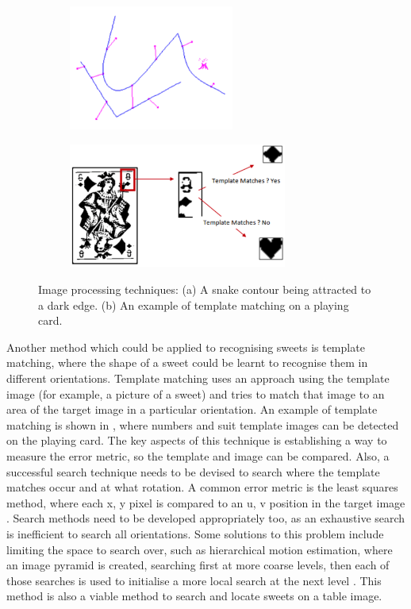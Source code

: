 \begin{figure}[H]
    \captionsetup[figure]{justification=centering}
    \begin{subfigure}[H]{0.475\textwidth}   
        \centering 
        \caption{}
        \includegraphics[width=\textwidth, height=4.1cm]{snake.png}
        \label{fig:snake}
    \end{subfigure}
    \begin{subfigure}[H]{0.475\textwidth}   
        \centering
        \caption{}
        \includegraphics[width=\textwidth, height=4.1cm]{template.png}
        \label{fig:template}
    \end{subfigure}
    \captionsetup{justification=centering}
    \caption{Image processing techniques: (a) A snake contour being attracted to a dark edge. (b) An example of template matching on a playing card.}
\end{figure}
Another method which could be applied to recognising sweets is template matching, where the shape of a sweet could be learnt to recognise them in different orientations. Template matching uses an approach using the template image (for example, a picture of a sweet) and tries to match that image to an area of the target image in a particular orientation. An example of template matching is shown in \textbf{}, where numbers and suit template images can be detected on the playing card. The key aspects of this technique is establishing a way to measure the error metric, so the template and image can be compared. Also, a successful search technique needs to be devised to search where the template matches occur and at what rotation. A common error metric is the least squares method, where each x, y pixel is compared to an u, v position in the target image \cite{robuststats}. Search methods need to be developed appropriately too, as an exhaustive search is inefficient to search all orientations. Some solutions to this problem include limiting the space to search over, such as hierarchical motion estimation, where an image pyramid is created, searching first at more coarse levels, then each of those searches is used to initialise a more local search at the next level \cite{quam}. This method is also a viable method to search and locate sweets on a table image.
